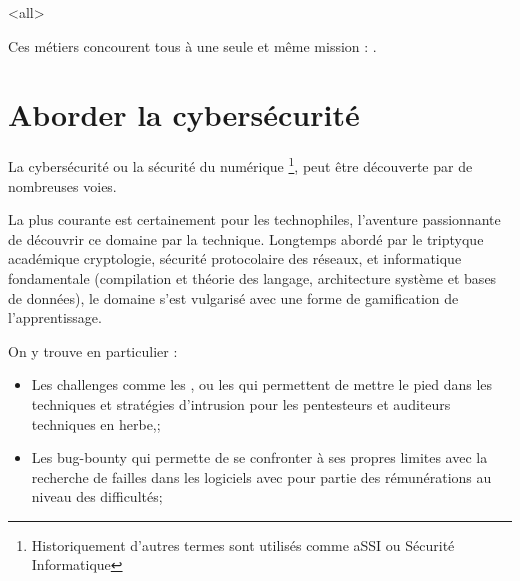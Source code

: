 \mode<all>{}

Ces métiers concourent tous à une seule et même mission : .





\section{Aborder la cybersécurité}


La cybersécurité ou la sécurité du numérique \footnote{Historiquement d'autres termes sont utilisés comme  \gls{aSSI} ou  Sécurité Informatique}, peut être découverte par de nombreuses voies.

La plus courante est certainement pour les technophiles, l'aventure passionnante de découvrir ce domaine par la technique.  Longtemps abordé par le triptyque académique cryptologie,   sécurité  protocolaire des réseaux, et informatique fondamentale (compilation et théorie des langage, architecture système et bases de données), le domaine s'est vulgarisé avec une forme de gamification de l'apprentissage.

On y trouve en particulier :

\begin{itemize}
  \item Les challenges comme les , ou les  qui permettent de mettre le pied dans les techniques et stratégies d'intrusion pour les pentesteurs et auditeurs techniques en herbe,;
  \item Les bug-bounty qui permette de se confronter à ses propres limites avec la recherche de failles dans les logiciels avec pour partie des rémunérations au niveau des difficultés;
\end{itemize}

